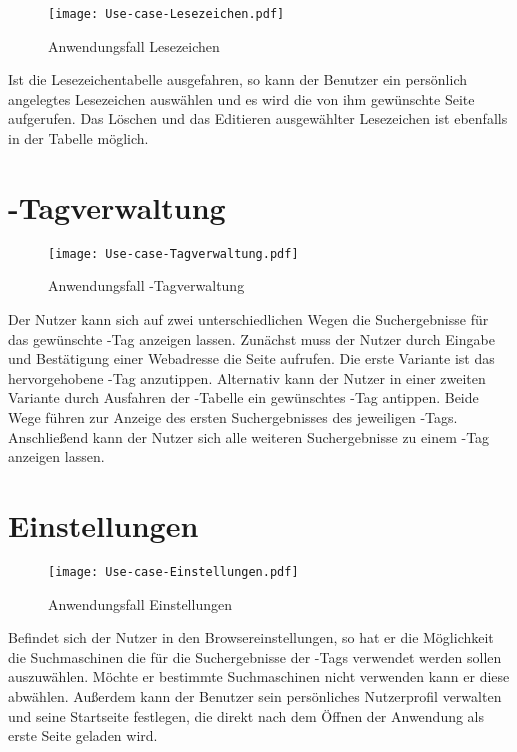 \begin{figure}[htb]
\centering
\texttt{[image: Use-case-Lesezeichen.pdf]}
	\caption{Anwendungsfall \glqq Lesezeichen\grqq\xspace}
\end{figure}

Ist die Lesezeichentabelle ausgefahren, so kann der Benutzer ein persönlich angelegtes Lesezeichen auswählen und es wird die von ihm gewünschte Seite aufgerufen. Das Löschen und das Editieren ausgewählter Lesezeichen ist ebenfalls in der Tabelle möglich.
\pagebreak

\section{\SEARCH-Tagverwaltung}

\begin{figure}[htb]
\centering
\texttt{[image: Use-case-Tagverwaltung.pdf]}
	\caption{Anwendungsfall \glqq \SEARCH-Tagverwaltung\grqq}
\end{figure}

Der Nutzer kann sich auf zwei unterschiedlichen Wegen die Suchergebnisse für das gewünschte \SEARCH-Tag anzeigen lassen. Zunächst muss der Nutzer durch Eingabe und Bestätigung einer Webadresse die Seite aufrufen. Die erste Variante ist das hervorgehobene \SEARCH-Tag anzutippen. Alternativ kann der Nutzer in einer zweiten Variante durch Ausfahren der \SEARCH-Tabelle ein gewünschtes \SEARCH-Tag antippen. Beide Wege führen zur Anzeige des ersten Suchergebnisses des jeweiligen \SEARCH-Tags. Anschließend kann der Nutzer sich alle weiteren Suchergebnisse zu einem \SEARCH-Tag anzeigen lassen.
\pagebreak

\section{Einstellungen}

\begin{figure}[htb]
\centering
\texttt{[image: Use-case-Einstellungen.pdf]}
	\caption{Anwendungsfall \glqq Einstellungen\grqq\xspace}
\end{figure}

Befindet sich der Nutzer in den Browsereinstellungen, so hat er die Möglichkeit die Suchmaschinen die für die Suchergebnisse der \SEARCH-Tags verwendet werden sollen auszuwählen. Möchte er bestimmte Suchmaschinen nicht verwenden kann er diese abwählen. Außerdem kann der Benutzer sein persönliches Nutzerprofil verwalten und seine Startseite festlegen, die direkt nach dem Öffnen der Anwendung als erste Seite geladen wird.